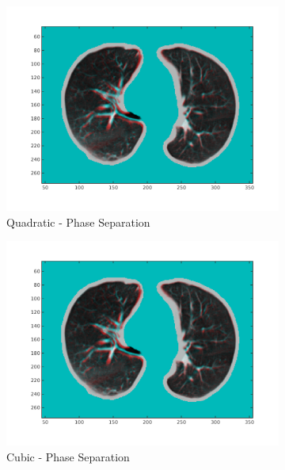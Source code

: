 \documentclass[11pt,a4paper,oneside]{report}
\begin{document}
\begin{figure}
\begin{subfigure}[b]{0.33\textwidth}
    \includegraphics[width=\textwidth, trim=0 50 0 0,clip=true]{figures/task4/visAss_m5.png}
    \caption{Quadratic - Phase Separation}
  \end{subfigure}
  \begin{subfigure}[b]{0.33\textwidth}
    \includegraphics[width=\textwidth, trim=0 50 0 0,clip=true]{figures/task4/visAss_m6.png}
    \caption{Cubic - Phase Separation}
  \end{subfigure}
  ~
  \hspace*{-2em}
  \begin{subfigure}[b]{0.33\textwidth}

\end{subfigure}
\end{figure}
\end{document}
